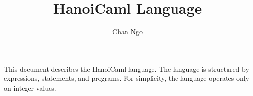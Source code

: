 \documentclass[a4paper]{article}
\title{HanoiCaml Language}
\author{Chan Ngo}
\date{}
\begin{document}
\fontsize{10}{14}
\selectfont
\maketitle

This document describes the HanoiCaml language. The language is structured by expressions, statements, and programs. For simplicity, the language operates only on integer values.



\end{document}

